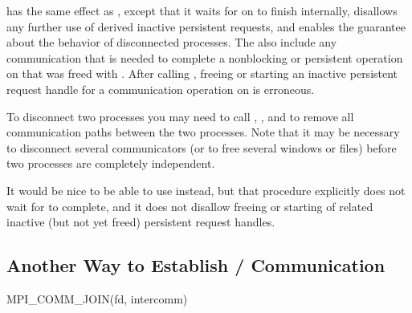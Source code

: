  has the same effect as
, except that it waits for
on  to finish internally,
disallows any further use of derived inactive persistent requests,
and enables the
guarantee about the behavior of disconnected processes.
The  also
include any communication
that is needed to complete a nonblocking or persistent operation on 
that was freed with .
After calling , freeing or starting
an inactive persistent request handle for a communication operation on  is erroneous.

\begin{users}
To disconnect two processes you may need to call
, ,
and  to remove all communication paths
between the two processes.  Note that it may be necessary to
disconnect several communicators (or to free several windows or files)
before two processes are completely independent.
\end{users}

\begin{rationale}
It would be nice to be able to use  instead,
but that procedure explicitly does not wait for
 to complete,
and it does not disallow freeing or starting of related inactive (but not yet freed)
persistent request handles.
\end{rationale}

\subsection{Another Way to Establish \texorpdfstring{\MPI/}{MPI} Communication}

%
\begin{funcdef}{MPI\_COMM\_JOIN}{(\mbox{fd}, \mbox{intercomm})}
\end{funcdef}

